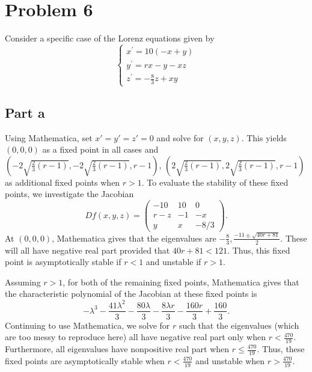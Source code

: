 \documentclass{article}
\begin{document}
\section{Problem 6}
Consider a specific case of the Lorenz equations given by
\begin{equation*}
	\left\{\begin{array}{l}
		x^{\prime}=10(-x+y) \\
		y^{\prime}=r x-y-x z \\
		z^{\prime}=-\frac{8}{3} z+x y
	\end{array}\right.
\end{equation*}

\subsection{Part a}
Using Mathematica, set $x'=y'=z'=0$ and solve for $(x,y,z)$. This yields $(0,0,0)$ as a fixed point in all cases and $\left(-2\sqrt{\frac{2}{3}(r-1)},-2\sqrt{\frac{2}{3}(r-1)},r-1\right)$, $\left(2\sqrt{\frac{2}{3}(r-1)},2\sqrt{\frac{2}{3}(r-1)},r-1\right)$ as additional fixed points when $r>1$. To evaluate the stability of these fixed points, we investigate the Jacobian 
\[
Df(x,y,z)=\begin{pmatrix}
	-10&10&0\\
	r-z&-1&-x\\
	y&x&-8/3
\end{pmatrix}.
\]
At $(0,0,0)$, Mathematica gives that the eigenvalues are $-\frac{8}{3},\frac{-11\pm\sqrt{40r+81}}{2}$. These will all have negative real part provided that $40r+81<121$. Thus, this fixed point is asymptotically stable if $r<1$ and unstable if $r>1$. 

Assuming $r>1$, for both of the remaining fixed points, Mathematica gives that the characteristic polynomial of the Jacobian at these fixed points is
\[
-\lambda ^3-\frac{41 \lambda ^2}{3}-\frac{80 \lambda }{3}-\frac{8 \lambda  r}{3}-\frac{160 r}{3}+\frac{160}{3}.
\]
Continuing to use Mathematica, we solve for $r$ such that the eigenvalues (which are too messy to reproduce here) all have negative real part only when $r<\frac{470}{19}$. Furthermore, all eigenvalues have nonpositive real part when $r\leq\frac{470}{19}$. Thus, these fixed points are asymptotically stable when $r<\frac{470}{19}$ and unstable when $r>\frac{470}{19}$.
\end{document}
